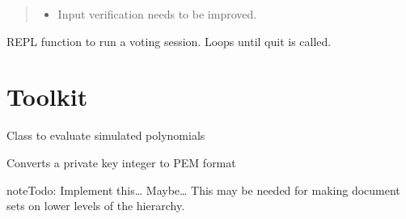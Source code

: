 \documentclass[letterpaper,10pt,english]{sphinxmanual}
\begin{document}
\begin{fulllineitems}
\begin{fulllineitems}
\begin{quote}
\begin{description}
\begin{itemize}
\item {} 
 \textendash{} Input verification needs to be improved.

\end{itemize}

\end{description}\end{quote}

\end{fulllineitems}


\begin{fulllineitems}
\label{\detokenize{index:VoteSession.VoteSim.repl}}
REPL function to run a voting session. Loops until quit is called.

\end{fulllineitems}


\end{fulllineitems}

\label{\detokenize{index:module-Toolkit}}

\chapter{Toolkit}
\label{\detokenize{index:toolkit}}

\begin{fulllineitems}
\label{\detokenize{index:Toolkit.Polynomial}}
Class to evaluate simulated polynomials

\end{fulllineitems}


\begin{fulllineitems}
\label{\detokenize{index:Toolkit.convvert_to_PEM}}
Converts a private key integer to PEM format

\begin{sphinxadmonition}{note}{Todo:}
Implement this… Maybe… This may be needed for making document sets on lower levels of the hierarchy.
\end{sphinxadmonition}

\end{fulllineitems}
\end{document}
